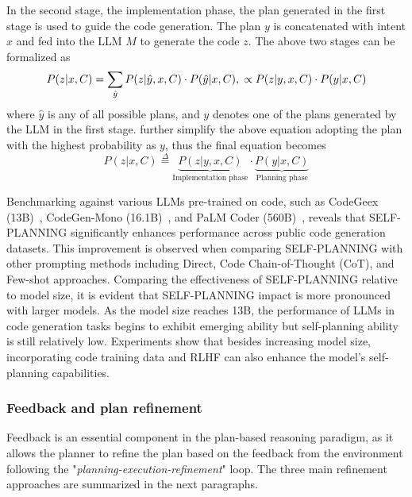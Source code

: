 In the second stage, the implementation phase, the plan generated in the first stage is used to guide the code generation.
The plan $y$ is concatenated with intent $x$ and fed into the LLM $M$ to generate the code $z$.
The above two stages can be formalized as
\begin{equation}
	P(z|x, C) = \sum_{\hat{y}}{P(z|\hat{y}, x, C) \cdot P(\hat{y}|x, C)},\\
	\propto P(z|y, x, C) \cdot P(y|x, C)
	\label{eq:self-planning-all}
\end{equation}
where $\hat{y}$ is any of all possible plans, and $y$ denotes one of the plans generated by the LLM in the first stage.
\textcite{jiang2024selfplanning} further simplify the above equation adopting the plan with the highest probability as $y$, thus the final equation becomes
\begin{equation}
	P(z|x, C) \stackrel{\Delta}{=} \underbrace{P(z|y, x, C)}_\text{Implementation phase} \cdot \underbrace{P(y|x, C)}_\text{Planning phase}
	\label{eq:self-planning-final}
\end{equation}

Benchmarking against various LLMs pre-trained on code, such as CodeGeex (13B)~\cite{zheng2023codegeex}, CodeGen-Mono (16.1B)~\cite{nijkamp2022codegen}, and PaLM Coder (560B)~\cite{chung2022scaling}, reveals that SELF-PLANNING significantly enhances performance across public code generation datasets.
This improvement is observed when comparing SELF-PLANNING with other prompting methods including Direct, Code Chain-of-Thought (CoT), and Few-shot approaches.
Comparing the effectiveness of SELF-PLANNING relative to model size, it is evident that SELF-PLANNING impact is more pronounced with larger models.
As the model size reaches 13B, the performance of LLMs in code generation tasks begins to exhibit emerging ability but self-planning ability is still relatively low.
Experiments show that besides increasing model size, incorporating code training data and RLHF can also enhance the model’s self-planning capabilities.

\subsubsection{Feedback and plan refinement}
\label{subsubsec:feedback}

Feedback is an essential component in the plan-based reasoning paradigm, as it allows the planner to refine the plan based on the feedback from the environment following the "\textit{planning-execution-refinement}" loop.
The three main refinement approaches are summarized in the next paragraphs.

